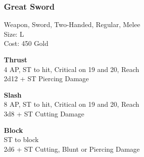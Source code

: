 \subsubsection{Great Sword}\label{weapon:greatSword}
Weapon, Sword, Two-Handed, Regular, Melee\\
Size: L\\
Cost: 450 Gold

\textbf{Thrust}\\
4 AP, ST to hit, Critical on 19 and 20,  Reach\\
2d12 + \texttimes ST Piercing Damage

\textbf{Slash}\\
8 AP, ST to hit, Critical on 19 and 20,  Reach\\
3d8 + \texttimes ST Cutting Damage

\textbf{Block}\\
ST to block\\
2d6 + \texttimes ST Cutting, Blunt or Piercing Damage